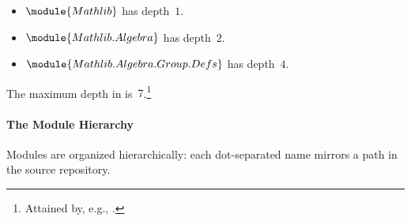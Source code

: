 \begin{example}
\leavevmode
\begin{itemize}
  \item $\module{Mathlib}$ has depth~$1$.
  \item $\module{Mathlib.Algebra}$ has depth~$2$.
  \item $\module{Mathlib.Algebra.Group.Defs}$ has depth~$4$.
\end{itemize}
The maximum depth in  is~$7$.\footnote{Attained by, e.g., .}
\end{example}

\paragraph{The Module Hierarchy}
\label{sec:namespace-tree}

Modules are organized hierarchically: each dot-separated name mirrors a path in the source repository.

